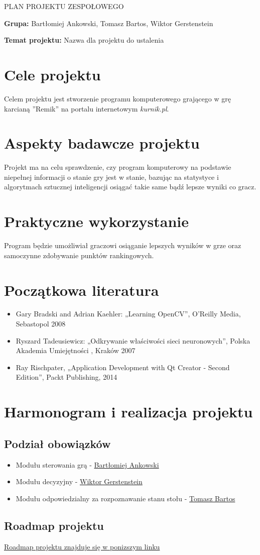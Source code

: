\documentclass[11pt]{article}
\begin{document}
\title{}
\begin{center}
\Large{PLAN PROJEKTU ZESPOŁOWEGO}
\end{center} 

\textbf{Grupa:} Bartłomiej Ankowski, Tomasz Bartos, Wiktor Gerstenstein

\textbf{Temat projektu:} Nazwa dla projektu do ustalenia

\section{Cele projektu}
Celem projektu jest stworzenie programu komputerowego grającego w grę karcianą ''Remik'' na portalu internetowym \textit{kurnik.pl}.

\section{Aspekty badawcze projektu}
Projekt ma na celu sprawdzenie, czy program komputerowy na podstawie niepełnej informacji o stanie gry  jest w stanie, bazując na statystyce i algorytmach sztucznej inteligencji osiągać takie same bądź lepsze wyniki co gracz.

\section{Praktyczne wykorzystanie}
Program będzie umożliwiał graczowi osiąganie lepszych wyników w grze oraz samoczynne zdobywanie punktów rankingowych.

\section{Początkowa literatura}
\begin{itemize}
\item Gary Bradski and Adrian Kaehler: „Learning OpenCV”, O’Reilly Media, Sebastopol 2008
\item Ryszard Tadeusiewicz: „Odkrywanie właściwości sieci neuronowych”, Polska Akademia Umiejętności , Kraków 2007
\item Ray Rischpater, „Application Development with Qt Creator - Second Edition”, Packt Publishing, 2014
\end{itemize}

\section{Harmonogram i realizacja projektu}

\subsection{Podział obowiązków}
\begin{itemize}
\item Modułu sterowania grą - \underline{Bartłomiej Ankowski}
\item Modułu decyzyjny - \underline{Wiktor Gerstenstein}
\item Modułu odpowiedzialny za rozpoznawanie stanu stołu - \underline{Tomasz Bartos}
\end{itemize}

\subsection{Roadmap projektu}
\href{https://trello.com/b/PmTsc0OK/team-project-art-roadmap}{Roadmap projektu znajduje się w ponizszym linku}
\end{document}
